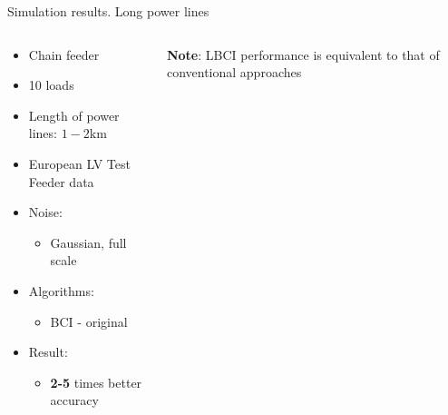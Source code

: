 \documentclass[../main.tex]{subfiles}
\begin{document}
\begin{frame}[t]{Simulation results. Long power lines}

\begin{columns}[t]
\begin{column}{0.4\textwidth}
\centering
\begin{itemize}
\item Chain feeder
\item 10 loads
\item Length of power lines: $1-2$km
\item European LV Test Feeder data
\item Noise: 
	\begin{itemize}
		\item Gaussian, full scale
	\end{itemize}
\item Algorithms:
	\begin{itemize}
		\item BCI - original
	\end{itemize}
\item Result:
	\begin{itemize}
		\item \textbf{2-5} times better accuracy
	\end{itemize}
\end{itemize}
\end{column}
\begin{column}{0.7\textwidth}
	\textbf{Note}: LBCI performance is equivalent to that of conventional approaches
	\centering
	\begin{figure}[H]
	\begin{adjustbox}{width=0.75\columnwidth}
	
	\end{adjustbox}
	\end{figure}
\end{column}
\end{columns}

\end{frame}
\end{document}
